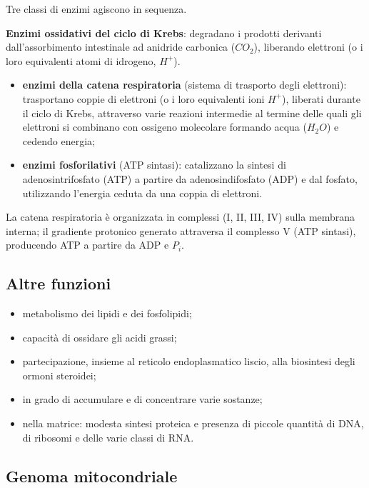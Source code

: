 Tre classi di enzimi agiscono in sequenza.

\textbf{Enzimi ossidativi del ciclo di Krebs}: degradano i prodotti derivanti dall'assorbimento intestinale ad anidride carbonica ($CO_2$), liberando elettroni (o i loro equivalenti atomi di idrogeno, $H^+$).

\begin{itemize}
  \item \textbf{enzimi della catena respiratoria} (sistema di trasporto degli elettroni): trasportano coppie di elettroni (o i loro equivalenti ioni $H^+$), liberati durante il ciclo di Krebs, attraverso varie reazioni intermedie al termine delle quali gli elettroni si combinano con ossigeno molecolare formando acqua ($H_2O$) e cedendo energia;
  \item \textbf{enzimi fosforilativi} (ATP sintasi): catalizzano la sintesi di adenosintrifosfato (ATP) a partire da adenosindifosfato (ADP) e dal fosfato, utilizzando l'energia ceduta da una coppia di elettroni.
\end{itemize}

La catena respiratoria è organizzata in complessi (I, II, III, IV) sulla membrana interna; il gradiente protonico generato attraversa il complesso V (ATP sintasi), producendo ATP a partire da ADP e $P_i$.

\subsection{Altre funzioni}

\begin{itemize}
  \item metabolismo dei lipidi e dei fosfolipidi;
  \item capacità di ossidare gli acidi grassi;
  \item partecipazione, insieme al reticolo endoplasmatico liscio, alla biosintesi degli ormoni steroidei;
  \item in grado di accumulare e di concentrare varie sostanze;
  \item nella matrice: modesta sintesi proteica e presenza di piccole quantità di DNA, di ribosomi e delle varie classi di RNA.
\end{itemize}

\subsection{Genoma mitocondriale}

